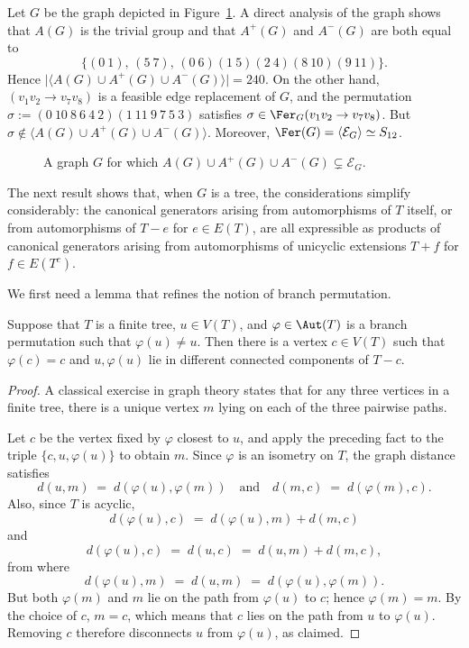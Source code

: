 \begin{example}\label{example:dif_groups}
    Let $G$ be the graph depicted in Figure~\ref{fig:Counterexample}.
    A direct analysis of the graph shows that $A(G)$ is the trivial group and that $A^+(G)$ and $A^-(G)$ are both equal to
    $$
        \bigl\{(0\ 1),\,(5\ 7),\,(0\ 6)(1\ 5)(2\ 4)(8\ 10)(9\ 11)\bigr\}.
    $$
    Hence $\bigl|\langle A(G)\cup A^+(G)\cup A^-(G)\rangle\bigr|=240$.
    On the other hand, $(v_1v_2\to v_7v_8)$ is a feasible edge replacement of $G$, and the permutation $\sigma:=(0\ 10\ 8\ 6\ 4\ 2)(1\ 11\ 9\ 7\ 5\ 3)$ satisfies $\sigma\in\Fer_G(v_1v_2\to v_7v_8)$.
    But $\sigma\notin\langle A(G)\cup A^+(G)\cup A^-(G)\rangle$.
    Moreover, $\Fer(G)=\langle\mathcal E_G\rangle\simeq S_{12}$.

    \begin{figure}[ht]
        \centering
        
        \caption{A graph $G$ for which $A(G)\cup A^+(G)\cup A^-(G)\subsetneq\mathcal E_G$.}
        \label{fig:Counterexample}
    \end{figure}
\end{example}

The next result shows that, when $G$ is a tree, the considerations simplify considerably: the canonical generators arising from automorphisms of $T$ itself, or from automorphisms of $T-e$ for $e\in E(T)$, are all expressible as products of canonical generators arising from automorphisms of unicyclic extensions $T+f$ for $f\in E(T^c)$.

We first need a lemma that refines the notion of branch permutation.

\begin{lemma}\label{lemma:median-tree-is-fixed}
    Suppose that $T$ is a finite tree, $u\in V(T)$, and $\varphi\in\Aut(T)$ is a branch permutation such that $\varphi(u)\neq u$.
    Then there is a vertex $c\in V(T)$ such that $\varphi(c)=c$ and $u,\varphi(u)$ lie in different connected components of $T-c$.
\end{lemma}

\begin{proof}
    A classical exercise in graph theory states that for any three vertices in a finite tree, there is a unique vertex $m$ lying on each of the three pairwise paths.

    Let $c$ be the vertex fixed by $\varphi$ closest to $u$, and apply the preceding fact to the triple $\{c,u,\varphi(u)\}$ to obtain $m$.
    Since $\varphi$ is an isometry on $T$, the graph distance satisfies
    $$
        d(u,m)\;=\;d(\varphi(u),\varphi(m))\quad\text{and}\quad d(m,c)\;=\;d(\varphi(m),c).
    $$
    Also, since $T$ is acyclic,
    $$
        d(\varphi(u),c)\;=\;d(\varphi(u),m)+d(m,c)
    $$
    and
    $$
        d(\varphi(u),c)\;=\;d(u,c)\;=\;d(u,m)+d(m,c),
    $$
    from where
    $$
        d(\varphi(u),m)\;=\;d(u,m)\;=\;d(\varphi(u),\varphi(m)).
    $$
    But both $\varphi(m)$ and $m$ lie on the path from $\varphi(u)$ to $c$; hence $\varphi(m)=m$.
    By the choice of $c$, $m=c$, which means that $c$ lies on the path from $u$ to $\varphi(u)$.
    Removing $c$ therefore disconnects $u$ from $\varphi(u)$, as claimed.
\end{proof}

